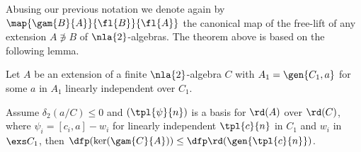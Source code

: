 Abusing our previous notation we denote again by $\map{\gam{B}{A}}{\fl{B}}{\fl{A}}$ the canonical map of
the free-lift of any extension $A\nni B$ of $\nla{2}$-algebras.
The theorem above is based on the following lemma.
\begin{lem}\label{crocolemma}
Let $A$ be an extension of a finite $\nla{2}$-algebra $C$ with %
$A_{1}=\gen{C_{1},a}$ for some $a$ in $A_{1}$ linearly independent over $C_{1}$.

Assume $\delta_{2}(a/ C)\leq0$ and $\left(\tpl{\psi}{n}\right)$ is a basis
for $\rd(A)$ over $\rd(C)$, where $\psi_{i}=[c_{i},a]-w_{i}$ for linearly independent $\tpl{c}{n}$ in
$C_{1}$ and $w_{i}$ in $\exs C_{1}$, then $\dfp(\ker(\gam{C}{A}))\leq\dfp\rd(\gen{\tpl{c}{n}})$.
\end{lem}

